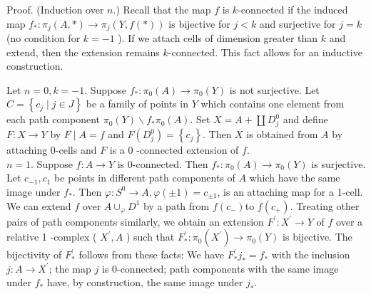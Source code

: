 \documentclass[10pt, letterpaper]{article}
\begin{document}
Proof. (Induction over $n$.) Recall that the map $f$ is $k$-connected if the induced map $f_{*}: \pi_{j}(A, *) \rightarrow \pi_{j}(Y, f(*))$ is bijective for $j<k$ and surjective for $j=k$ (no condition for $k=-1$ ). If we attach cells of dimension greater than $k$ and extend, then the extension remains $k$-connected. This fact allows for an inductive construction.

Let $n=0, k=-1$. Suppose $f_{*}: \pi_{0}(A) \rightarrow \pi_{0}(Y)$ is not surjective. Let $C=\left\{c_{j} \mid j \in J\right\}$ be a family of points in $Y$ which contains one element from each path component $\pi_{0}(Y) \backslash f_{*} \pi_{0}(A)$. Set $X=A+\coprod D_{j}^{0}$ and define $F: X \rightarrow Y$ by $F \mid A=f$ and $F\left(D_{j}^{0}\right)=\left\{c_{j}\right\}$. Then $X$ is obtained from $A$ by attaching 0-cells and $F$ is a 0 -connected extension of $f$.\\
$n=1$. Suppose $f: A \rightarrow Y$ is 0-connected. Then $f_{*}: \pi_{0}(A) \rightarrow \pi_{0}(Y)$ is surjective. Let $c_{-1}, c_{1}$ be points in different path components of $A$ which have the same image under $f_{*}$. Then $\varphi: S^{0} \rightarrow A, \varphi( \pm 1)=c_{ \pm 1}$, is an attaching map for a 1-cell. We can extend $f$ over $A \cup_{\varphi} D^{1}$ by a path from $f\left(c_{-}\right)$to $f\left(c_{+}\right)$. Treating other pairs of path components similarly, we obtain an extension $F^{\prime}: X^{\prime} \rightarrow Y$ of $f$ over a relative 1 -complex ( $X^{\prime}, A$ ) such that $F_{*}^{\prime}: \pi_{0}\left(X^{\prime}\right) \rightarrow \pi_{0}(Y)$ is bijective. The bijectivity of $F_{*}^{\prime}$ follows from these facts: We have $F_{*}^{\prime} j_{*}=f_{*}$ with the inclusion $j: A \rightarrow X^{\prime}$; the map $j$ is 0-connected; path components with the same image under $f_{*}$ have, by construction, the same image under $j_{*}$.
\end{document}
